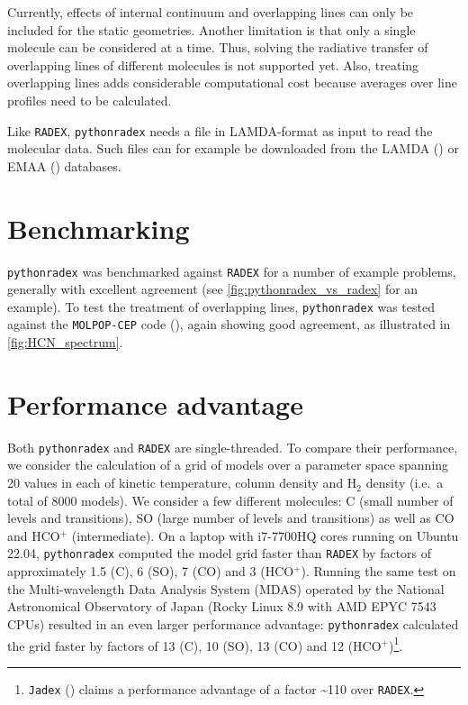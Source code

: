 \documentclass[
]{article}
\begin{document}
Currently, effects of internal continuum and overlapping lines can only
be included for the static geometries. Another limitation is that only a
single molecule can be considered at a time. Thus, solving the radiative
transfer of overlapping lines of different molecules is not supported
yet. Also, treating overlapping lines adds considerable computational
cost because averages over line profiles need to be calculated.

Like \texttt{RADEX}, \texttt{pythonradex} needs a file in LAMDA-format
as input to read the molecular data. Such files can for example be
downloaded from the LAMDA () or EMAA () databases.

\section{Benchmarking}\label{benchmarking}

\texttt{pythonradex} was benchmarked against \texttt{RADEX} for a number
of example problems, generally with excellent agreement (see
\autoref{fig:pythonradex_vs_radex} for an example). To test the
treatment of overlapping lines, \texttt{pythonradex} was tested against
the \texttt{MOLPOP-CEP} code (), again showing good agreement, as illustrated
in \autoref{fig:HCN_spectrum}.

\section{Performance advantage}\label{performance-advantage}

Both \texttt{pythonradex} and \texttt{RADEX} are single-threaded. To
compare their performance, we consider the calculation of a grid of
models over a parameter space spanning 20 values in each of kinetic
temperature, column density and H\(_2\) density (i.e.~a total of 8000
models). We consider a few different molecules: C (small number of
levels and transitions), SO (large number of levels and transitions) as
well as CO and HCO\(^+\) (intermediate). On a laptop with i7-7700HQ
cores running on Ubuntu 22.04, \texttt{pythonradex} computed the model
grid faster than \texttt{RADEX} by factors of approximately 1.5 (C), 6
(SO), 7 (CO) and 3 (HCO\(^+\)). Running the same test on the
Multi-wavelength Data Analysis System (MDAS) operated by the National
Astronomical Observatory of Japan (Rocky Linux 8.9 with AMD EPYC 7543
CPUs) resulted in an even larger performance advantage:
\texttt{pythonradex} calculated the grid faster by factors of 13 (C), 10
(SO), 13 (CO) and 12 (HCO\(^+\))\footnote{\texttt{Jadex}
  () claims a performance advantage
  of a factor \textasciitilde110 over \texttt{RADEX}.}.
\end{document}
